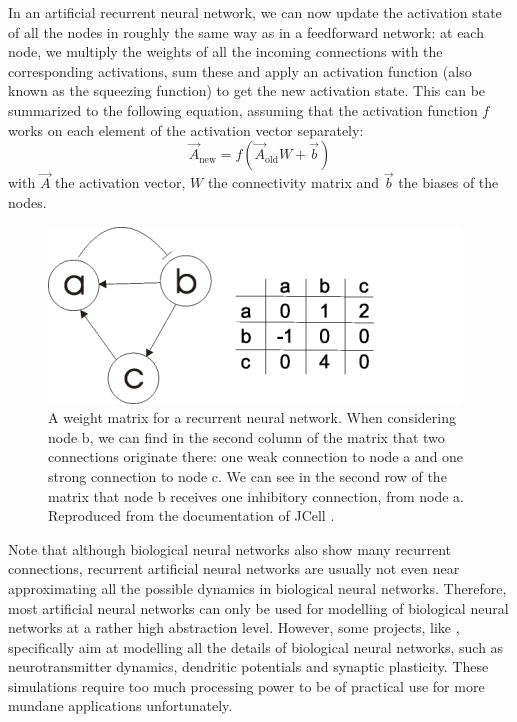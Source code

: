 \documentclass[10pt,a4paper]{report}
\begin{document}
In an artificial recurrent neural network, we can now update the activation state of all the nodes in roughly the same way as in a feedforward network: at each node, we multiply the weights of all the incoming connections with the corresponding activations, sum these and apply an activation function (also known as the squeezing function) to get the new activation state. This can be summarized to the following equation, assuming that the activation function $f$ works on each element of the activation vector separately:
\begin{equation}
 \vec{A}_{\text{new}} = f(\vec{A}_{\text{old}} W + \vec{b} ) \label{update}
\end{equation}
with $\vec{A}$ the activation vector, $W$ the connectivity matrix and $\vec{b}$ the biases of the nodes.  

\begin{figure}[bthp]
\begin{center}
\includegraphics[scale=1.6]{figures/weightGraph.png}
\caption{A weight matrix for a recurrent neural network. When considering node b, we can find in the second column of the matrix that two connections originate there: one weak connection to node a and one strong connection to node c. We can see in the second row of the matrix that node b receives one inhibitory connection, from node a. Reproduced from the documentation of JCell \citep{Spieth2006}. }
\label{weightmatrix}
\end{center} 
\end{figure}

Note that although biological neural networks also show many recurrent connections, recurrent artificial neural networks are usually not even near approximating all the possible dynamics in biological neural networks. Therefore, most artificial neural networks can only be used for modelling of biological neural networks at a rather high abstraction level. However, some projects, like \citet{Pecevski2009}, specifically aim at modelling all the details of biological neural networks, such as neurotransmitter dynamics, dendritic potentials and synaptic plasticity. These simulations require too much processing power to be of practical use for more mundane applications unfortunately.
\end{document}
